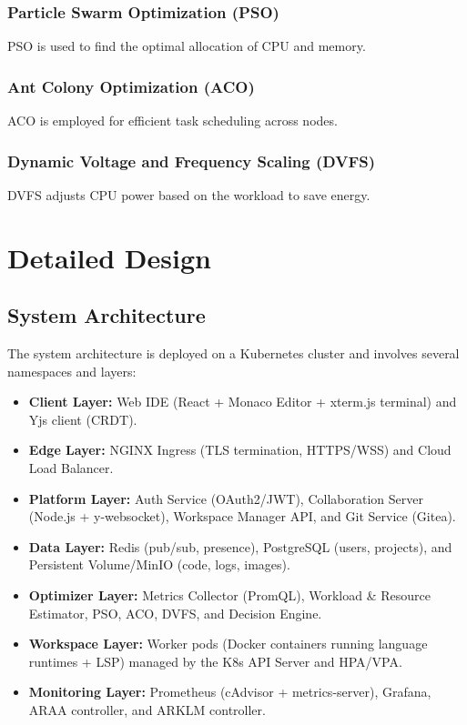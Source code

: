 \documentclass[12pt,a4paper]{report}
\begin{document}
\subsection{Particle Swarm Optimization (PSO)}
PSO is used to find the optimal allocation of CPU and memory.

\subsection{Ant Colony Optimization (ACO)}
ACO is employed for efficient task scheduling across nodes.

\subsection{Dynamic Voltage and Frequency Scaling (DVFS)}
DVFS adjusts CPU power based on the workload to save energy.

\chapter{Detailed Design}
\section{System Architecture}
The system architecture is deployed on a Kubernetes cluster and involves several namespaces and layers:
\begin{itemize}
    \item \textbf{Client Layer:} Web IDE (React + Monaco Editor + xterm.js terminal) and Yjs client (CRDT).
    \item \textbf{Edge Layer:} NGINX Ingress (TLS termination, HTTPS/WSS) and Cloud Load Balancer.
    \item \textbf{Platform Layer:} Auth Service (OAuth2/JWT), Collaboration Server (Node.js + y-websocket), Workspace Manager API, and Git Service (Gitea).
    \item \textbf{Data Layer:} Redis (pub/sub, presence), PostgreSQL (users, projects), and Persistent Volume/MinIO (code, logs, images).
    \item \textbf{Optimizer Layer:} Metrics Collector (PromQL), Workload \& Resource Estimator, PSO, ACO, DVFS, and Decision Engine.
    \item \textbf{Workspace Layer:} Worker pods (Docker containers running language runtimes + LSP) managed by the K8s API Server and HPA/VPA.
    \item \textbf{Monitoring Layer:} Prometheus (cAdvisor + metrics-server), Grafana, ARAA controller, and ARKLM controller.
\end{itemize}
\end{document}
